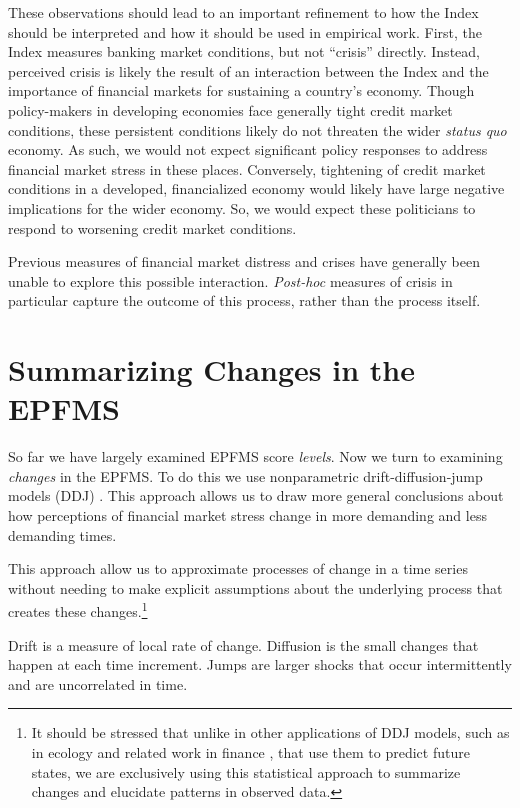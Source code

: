 \documentclass[]{article}
\begin{document}
These observations should lead to an important refinement to how the
Index should be interpreted and how it should be used in empirical work.
First, the Index measures banking market conditions, but not ``crisis''
directly. Instead, perceived crisis is likely the result of an
interaction between the Index and the importance of financial markets
for sustaining a country's economy. Though policy-makers in developing
economies face generally tight credit market conditions, these
persistent conditions likely do not threaten the wider \emph{status quo}
economy. As such, we would not expect significant policy responses to
address financial market stress in these places. Conversely, tightening
of credit market conditions in a developed, financialized economy would
likely have large negative implications for the wider economy. So, we
would expect these politicians to respond to worsening credit market
conditions.

Previous measures of financial market distress and crises have generally
been unable to explore this possible interaction. \emph{Post-hoc}
measures of crisis in particular capture the outcome of this process,
rather than the process itself.

\section{Summarizing Changes in the EPFMS}

So far we have largely examined EPFMS score \emph{levels}. Now we turn to examining \emph{changes} in the EPFMS. To do this we use nonparametric drift-diffusion-jump models (DDJ) \citep{Carpenter2011,Dakos2012}. This approach allows us to draw more general conclusions about how perceptions of financial market stress change in more demanding and less demanding times.

This approach allow us to approximate processes of change in a time series without needing to make explicit assumptions about the underlying process that creates these changes.\footnote{It should be stressed that unlike in other applications of DDJ models, such as in ecology and related work in finance \citep{Kou2008}, that use them to predict future states, we are exclusively using this statistical approach to summarize changes and elucidate patterns in observed data.}

Drift is a measure of local rate of change. Diffusion is the small changes that happen at each time increment. Jumps are larger shocks that occur intermittently and are uncorrelated in time.
\end{document}

